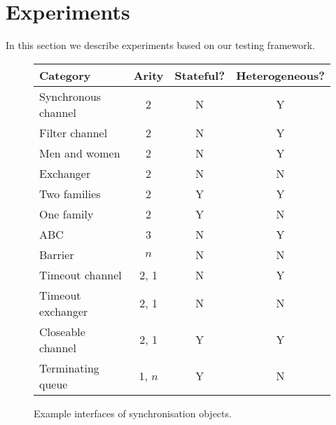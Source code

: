 \section{Experiments}
\label{sec:experiments}

In this section we describe experiments based on our testing framework. 


\begin{figure}
\begin{center}
\begin{tabular}{lccc}
Category            & Arity & Stateful? & Heterogeneous? \\ \hline
Synchronous channel & 2     & N         & Y \\
Filter channel      & 2     & N         & Y \\
Men and women        & 2     & N         & Y \\
Exchanger           & 2     & N         & N \\
Two families        & 2     & Y         & Y \\
One family          & 2     & Y         & N \\
ABC                 & 3     & N         & Y \\
Barrier             & $n$   & N         & N \\
Timeout channel     & 2, 1  & N         & Y \\
Timeout exchanger   & 2, 1  & N         & N \\
Closeable channel   & 2, 1  & Y         & Y \\
Terminating queue   & 1, $n$ & Y        & N  
\end{tabular}
\end{center}
\caption{Example interfaces of synchronisation objects.  \label{fig:examples}}
\end{figure}




